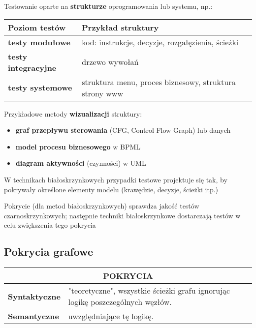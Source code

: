 \documentclass[../main.tex]{subfiles}
\begin{document}
    Testowanie oparte na \textbf{strukturze} oprogramowania lub systemu, np.:

    \begin{tabular}{p{4cm} || p{12cm}}
        \textbf{Poziom testów} & \textbf{Przykład struktury}\\
        \hline
        \hline
        \textbf{testy modułowe} & kod: instrukcje, decyzje, rozgałęzienia, ścieżki\\
        \hline
        \textbf{testy integracyjne} & drzewo wywołań\\
        \hline
        \textbf{testy systemowe} & struktura menu, proces biznesowy, struktura strony www\\
    \end{tabular}


    Przykładowe metody \textbf{wizualizacji} struktury:
    \begin{itemize}
        \item \textbf{graf przepływu sterowania} (CFG, Control Flow Graph) lub danych
        \item \textbf{model procesu biznesowego} w BPML
        \item \textbf{diagram aktywności} (czynności) w UML
    \end{itemize}
    W technikach białoskrzynkowych przypadki testowe projektuje się tak, by
    pokrywały określone elementy modelu (krawędzie, decyzje, ścieżki itp.)

    Pokrycie (dla metod białoskrzynkowych) sprawdza jakość testów czarnoskrzynkowych; następnie techniki
    białoskrzynkowe dostarczają testów w celu zwiększenia tego pokrycia

    \subsection{Pokrycia grafowe}

    \begin{table}[H]
        \begin{center}
            \begin{tabular}{p{8cm} | p{8cm}}
                \multicolumn{2}{c}{\textbf{POKRYCIA}}\\
                \hline
                \textbf{Syntaktyczne} & "teoretyczne", wszystkie ścieżki grafu ignorując logikę poszczególnych węzłów.\\
                \hline
                \textbf{Semantyczne} & uwzględniające tę logikę.\\

            \end{tabular}
        \end{center}
    \end{table}
\end{document}
